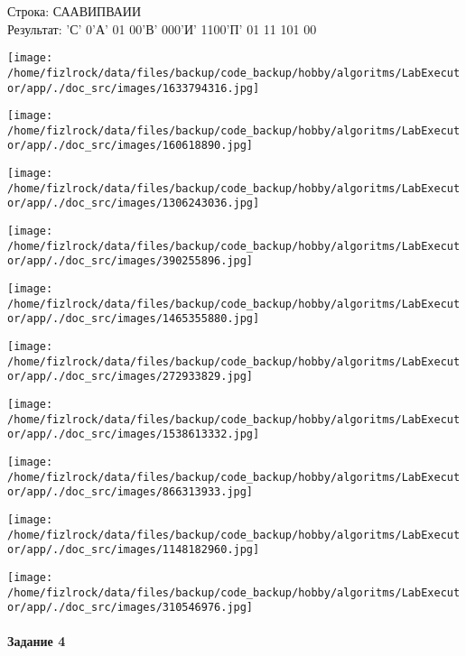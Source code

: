 \documentclass[a4paper, 12pt]{article}
\begin{document}
Строка: 
СААВИПВАИИ\\
Результат: 'С' 0'А' 01 00'В' 000'И' 1100'П' 01 11 101 00

\texttt{[image: /home/fizlrock/data/files/backup/code\_backup/hobby/algoritms/LabExecutor/app/./doc\_src/images/1633794316.jpg]}

\texttt{[image: /home/fizlrock/data/files/backup/code\_backup/hobby/algoritms/LabExecutor/app/./doc\_src/images/160618890.jpg]}

\texttt{[image: /home/fizlrock/data/files/backup/code\_backup/hobby/algoritms/LabExecutor/app/./doc\_src/images/1306243036.jpg]}

\texttt{[image: /home/fizlrock/data/files/backup/code\_backup/hobby/algoritms/LabExecutor/app/./doc\_src/images/390255896.jpg]}

\texttt{[image: /home/fizlrock/data/files/backup/code\_backup/hobby/algoritms/LabExecutor/app/./doc\_src/images/1465355880.jpg]}

\texttt{[image: /home/fizlrock/data/files/backup/code\_backup/hobby/algoritms/LabExecutor/app/./doc\_src/images/272933829.jpg]}

\texttt{[image: /home/fizlrock/data/files/backup/code\_backup/hobby/algoritms/LabExecutor/app/./doc\_src/images/1538613332.jpg]}

\texttt{[image: /home/fizlrock/data/files/backup/code\_backup/hobby/algoritms/LabExecutor/app/./doc\_src/images/866313933.jpg]}

\texttt{[image: /home/fizlrock/data/files/backup/code\_backup/hobby/algoritms/LabExecutor/app/./doc\_src/images/1148182960.jpg]}

\texttt{[image: /home/fizlrock/data/files/backup/code\_backup/hobby/algoritms/LabExecutor/app/./doc\_src/images/310546976.jpg]}
\pagebreak
\paragraph{Задание 4}
\end{document}
